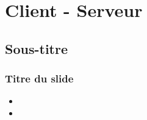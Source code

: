 \section{Client - Serveur}

	\subsection{Sous-titre}
		\begin{frame}
		    \frametitle{\textbf{Titre du slide}}
			\begin{itemize}
				 \item 
				 \item 
			\end{itemize}
		\end{frame}
